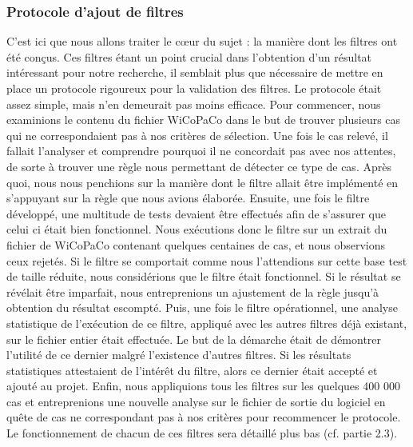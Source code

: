 \documentclass[11pt]{article}
\begin{document}
\subsubsection{Protocole d'ajout de filtres}
C'est ici que nous allons traiter le c{\oe}ur du sujet : la mani\`{e}re dont les filtres ont \'{e}t\'{e} con\c{c}us. Ces filtres \'{e}tant un point crucial dans l'obtention d'un r\'{e}sultat int\'{e}ressant pour notre recherche, il semblait plus que n\'{e}cessaire de mettre en place un protocole rigoureux pour la validation des filtres. Le protocole \'{e}tait assez simple, mais n'en demeurait pas moins efficace.
\newline
\newline
Pour commencer, nous examinions le contenu du fichier WiCoPaCo dans le but de trouver plusieurs cas qui ne correspondaient pas \`{a} nos crit\`{e}res de s\'{e}lection. Une fois le cas relev\'{e}, il fallait l'analyser et comprendre pourquoi il ne concordait pas avec nos attentes, de sorte \`{a} trouver une r\`{e}gle nous permettant de d\'{e}tecter ce type de cas. Apr\`{e}s quoi, nous nous penchions sur la mani\`{e}re dont le filtre allait \^{e}tre impl\'{e}ment\'{e} en s'appuyant sur la r\`{e}gle que nous avions \'{e}labor\'{e}e.
\newline
\newline
Ensuite, une fois le filtre d\'{e}velopp\'{e}, une multitude de tests devaient \^{e}tre effectu\'{e}s afin de s'assurer que celui ci \'{e}tait bien fonctionnel. Nous ex\'{e}cutions donc le filtre sur un extrait du fichier de WiCoPaCo contenant quelques centaines de cas, et nous observions ceux rejet\'{e}s. Si le filtre se comportait comme nous l'attendions sur cette base test de taille r\'{e}duite, nous consid\'{e}rions que le filtre \'{e}tait fonctionnel. Si le r\'{e}sultat se r\'{e}v\'{e}lait \^{e}tre imparfait, nous entreprenions un ajustement de la r\`{e}gle jusqu'\`{a} obtention du r\'{e}sultat escompt\'{e}. 
\newline
\newline
Puis, une fois le filtre op\'{e}rationnel, une analyse statistique de l'ex\'{e}cution de ce filtre, appliqu\'{e} avec les autres filtres d\'{e}j\`{a} existant, sur le fichier entier \'{e}tait effectu\'{e}e. Le but de la d\'{e}marche \'{e}tait de d\'{e}montrer l'utilit\'{e} de ce dernier malgr\'{e} l'existence d'autres filtres. Si les r\'{e}sultats statistiques attestaient de l'int\'{e}r\^{e}t du filtre, alors ce dernier \'{e}tait accept\'{e} et ajout\'{e} au projet.
\newline
\newline
Enfin, nous appliquions tous les filtres sur les quelques 400 000 cas et entreprenions une nouvelle analyse sur le fichier de sortie du logiciel en qu\^{e}te de cas ne correspondant pas \`{a} nos crit\`{e}res pour recommencer le protocole. Le fonctionnement de chacun de ces filtres sera d\'{e}taill\'{e} plus bas (cf. partie 2.3).
\end{document}
